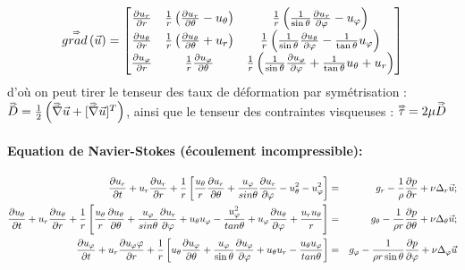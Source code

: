 $$
\accentset{\Rightarrow}{grad} \left( \vec{u} \right) 
=
\begin{bmatrix}
\frac{\partial u_r}{\partial r} & \frac{1}{r} \left( \frac{\partial u_r}{\partial \theta} - u_\theta \right) & \frac{1}{r} \left( \frac{1}{\sin \theta} \frac{\partial u_r}{\partial \varphi} - u_\varphi \right) \\
\frac{\partial u_\theta}{\partial r} & \frac{1}{r} \left( \frac{\partial u_\theta}{\partial \theta} + u_r \right) & \frac{1}{r} \left( \frac{1}{\sin \theta} \frac{\partial u_\theta}{\partial \varphi} - \frac{1}{\tan \theta} u_\varphi \right) \\
\frac{\partial u_\varphi}{\partial r} & \frac{1}{r} \frac{\partial u_\varphi}{\partial \theta} &  \frac{1}{r} \left( \frac{1}{\sin \theta} \frac{\partial u_\varphi}{\partial \varphi} + \frac{1}{\tan \theta} u_\theta + u_r \right)
\end{bmatrix}
$$
\noindent d'où on peut tirer le tenseur des taux de déformation par symétrisation : $\accentset{\Rightarrow}{D}=\frac{1}{2} \left( \accentset{\Rightarrow}{\nabla} \vec{ u} + [\accentset{\Rightarrow}{\nabla}\vec{  u}]^T \right)$, ainsi que le tenseur des contraintes visqueuses : $\accentset{\Rightarrow}{\tau} = 2 \mu \accentset{\Rightarrow}{D}$



\paragraph{Equation de Navier-Stokes (écoulement incompressible):}




\begin{eqnarray*}
\frac {\partial u_r} {\partial t} + u_r \frac {\partial u_r} {\partial r} 
+\frac{1}{r} \left[ 
 	\frac{u_{\theta}}{r} \frac {\partial u_r} {\partial \theta} 
	+ \frac{u_{\varphi}}{sin \theta} \frac {\partial u_r} {\partial \varphi} 
	- u_{\theta}^2 - u_{\varphi}^2
	\right] 
& = &
{ g_r} - \frac{1}{\rho} \frac {\partial p} {\partial r} +  \nu \Delta_r \vec{u};
\\
\frac {\partial u_{\theta}} {\partial t} 
+ u_r \frac {\partial u_{\theta}} {\partial r} 
+ \frac{1}{r} \left[ 
		\frac{u_{\theta}}{r} \frac {\partial u_{\theta}} {\partial \theta} 
		+ \frac{u_{\varphi}}{sin \theta} \frac {\partial u_r} {\partial \varphi} 
		+ u_\theta u_\varphi - \frac{u_\varphi^2}{tan \theta} 
		+ u_\varphi \frac {\partial u_{\theta}} {\partial \varphi} + \frac{u_r u_{\theta}}{r}
		\right] 
& = &
{ g_\theta} - \frac{1}{\rho r} \frac {\partial p} {\partial \theta} 
 +  \nu \Delta_\theta \vec{u}; 
 \\
\frac {\partial u_\varphi} {\partial t} + u_r \frac {\partial u_\varphi\varphi} {\partial r} 
+\frac{1}{r} \left[ 
	u_{\theta} \frac {\partial u_\varphi} {\partial \theta} 
	+ \frac{u_\varphi}{\sin \theta} \frac {\partial u_\varphi} {\partial \varphi} 
	+ u_\theta u_r - \frac{u_\theta u_\varphi}{tan \theta} 
		\right] 
&=&
{ g_\varphi}- \frac{1}{\rho r \sin \theta} \frac {\partial p} {\partial \varphi} + \nu \Delta_\varphi \vec{u}
\end{eqnarray*}




